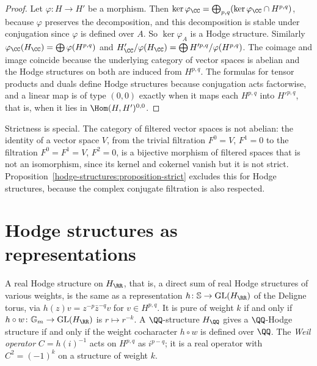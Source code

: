 \begin{proof}
Let $\varphi \colon H \to H'$ be a morphism. Then $\ker\varphi_\CC = \bigoplus_{p,q}(\ker\varphi_\CC \cap H^{p,q})$, because $\varphi$ preserves the decomposition, and this decomposition is
stable under conjugation since $\varphi$ is defined over $A$. So $\ker\varphi_A$ is a Hodge structure. Similarly $\varphi_\CC(H_\CC) = \bigoplus\varphi(H^{p,q})$ and
$H'_\CC/\varphi(H_\CC) = \bigoplus H'^{p,q}/\varphi(H^{p,q})$. The coimage and image coincide because the underlying category of vector spaces is abelian and the Hodge structures on both
are induced from $H^{p,q}$. The formulas for tensor products and duals define Hodge structures because conjugation acts factorwise, and a linear map is of type $(0,0)$ exactly when it
maps each $H^{p,q}$ into $H'^{p,q}$, that is, when it lies in $\Hom(H, H')^{0,0}$.
\end{proof}

\begin{counterexample}\label{hodge-structures:counterexample-filtered}
Strictness is special. The category of filtered vector spaces is not abelian: the identity of a vector space $V$, from the trivial filtration $F^0 = V$, $F^1 = 0$ to the filtration
$F^0 = F^1 = V$, $F^2 = 0$, is a bijective morphism of filtered spaces that is not an isomorphism, since its kernel and cokernel vanish but it is not strict. Proposition~\ref{hodge-structures:proposition-strict}
excludes this for Hodge structures, because the complex conjugate filtration is also respected.
\end{counterexample}

\section{Hodge structures as representations}\label{hodge-structures:section-representations}

\begin{proposition}\label{hodge-structures:proposition-deligne-torus}
A real Hodge structure on $H_\RR$, that is, a direct sum of real Hodge structures of various weights, is the same as a representation $h \colon \mathbb{S} \to \mathrm{GL}(H_\RR)$ of the
Deligne torus, via $h(z)v = z^{-p}\bar z^{-q}v$ for $v \in H^{p,q}$. It is pure of weight $k$ if and only if $h \circ w \colon \mathbb{G}_m \to \mathrm{GL}(H_\RR)$ is $r \mapsto r^{-k}$. A $\QQ$-structure
$H_\QQ$ gives a $\QQ$-Hodge structure if and only if the weight cocharacter $h \circ w$ is defined over $\QQ$. The \emph{Weil operator} $C = h(i)^{-1}$ acts on $H^{p,q}$ as $i^{p-q}$; it is a real
operator with $C^2 = (-1)^k$ on a structure of weight $k$.
\end{proposition}

